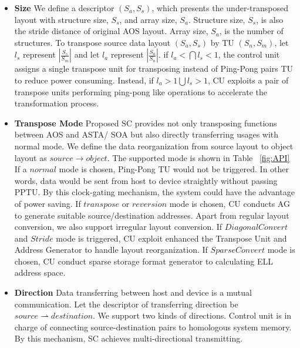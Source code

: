 \documentclass[10pt,journal,compsoc]{IEEEtran}
\begin{document}
\begin{itemize}

\item \textbf{Size }
We define a descriptor $ (S_{a}, S_{s}) $, which presents the under-transposed layout with structure size, $ S_{s} $, and array size, $ S_{a} $. Structure size, $ S_{s} $, is also the stride distance of original AOS layout. Array size, $ S_{a} $, is the number of structures.
To transpose source data layout  $(S_{a}, S_{s}) $ by TU $(S_{n}, S_{m})$, let $ l_{s} $ represent $ |\frac{S_{s}}{S_{m}}| $ and let $ l_{a} $ represent $ |\frac{S_{a}}{S_{n}}| $.
if $ l_{a} < \bigcap l_{s}<1 $, the control unit assigns a single transpose unit for transposing instead of Ping-Pong pairs TU to reduce power consuming. Instead, if $ l_{a}>1 \bigcup l_{s}>1 $, CU exploits a pair of transpose units performing ping-pong like operations to accelerate the transformation process.

\item  \textbf{Transpose Mode}
Proposed SC provides not only transposing functions between AOS and ASTA/ SOA but also directly transferring usages with normal mode. We define the data reorganization from source layout to object layout as $ source \rightarrow object $. The supported mode is shown in Table ~\ref{fig:API}%
If a $ normal $ mode is chosen, Ping-Pong TU would not be triggered. In other words, data would be sent from host to device straightly without passing PPTU. By this clock-gating mechanism, the system could have the advantage of power saving. If $ transpose $ or $ reversion $ mode is chosen, CU conducts AG to generate suitable source/destination addresses. Apart from regular layout conversion, we also support irregular layout conversion. If $DiagonalConvert $ and $Stride$ mode is triggered, CU exploit enhanced the Transpose Unit and Address Generator to handle layout reorganization. If $SparseConvert $ mode is chosen, CU conduct sparse storage format generator to calculating ELL address space.

\item  \textbf{Direction}
Data transferring between host and device is a mutual communication. Let the descriptor of transferring direction be $ source\rightharpoonup destination $. We support two kinds of directions. Control unit is in charge of connecting source-destination pairs to homologous system memory. By this mechanism, SC achieves multi-directional transmitting.

\end{itemize}
\end{document}
